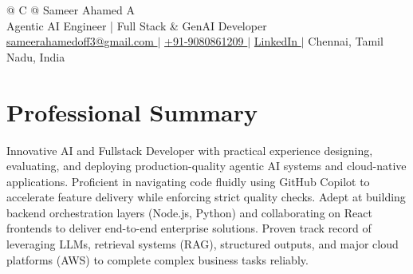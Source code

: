 \documentclass[a4paper,10pt]{article}
\begin{document}
\pagestyle{empty} 

\begin{tabularx}{\linewidth}{@{} C @{}}
\Huge{Sameer Ahamed A} \\[6pt]
Agentic AI Engineer | Full Stack \& GenAI Developer \\

\href{mailto:sameerahamedoff3@gmail.com}{{\faEnvelope} sameerahamedoff3@gmail.com } $|$
\href{tel:+919080861209}{{\faMobile} +91-9080861209 } $|$
\href{https://www.linkedin.com/in/sameer-ahamed-338558310/}{{{\raisebox{-0.05\height}{\faLinkedin} LinkedIn }}} $|$
Chennai, Tamil Nadu, India
\end{tabularx}

\section{Professional Summary}
Innovative AI and Fullstack Developer with practical experience designing, evaluating, and deploying production-quality agentic AI systems and cloud-native applications. Proficient in navigating code fluidly using GitHub Copilot to accelerate feature delivery while enforcing strict quality checks. Adept at building backend orchestration layers (Node.js, Python) and collaborating on React frontends to deliver end-to-end enterprise solutions. Proven track record of leveraging LLMs, retrieval systems (RAG), structured outputs, and major cloud platforms (AWS) to complete complex business tasks reliably.
\end{document}
